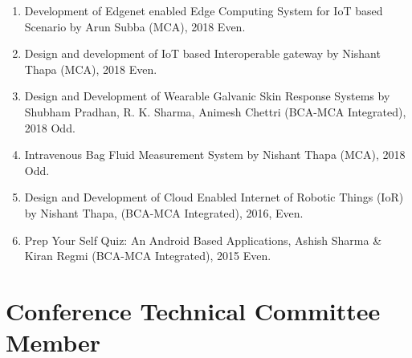 \documentclass[11pt,a4paper]{moderncv}
\begin{document}
\begin{adjustwidth}{6em}{0pt}
\begin{enumerate}
		\item Development of Edgenet enabled Edge Computing System for IoT based Scenario by Arun Subba (MCA), 2018 Even.
		
		\item Design and development of IoT based Interoperable gateway by Nishant Thapa (MCA), 2018 Even.
		
		\item Design and Development of Wearable Galvanic Skin Response Systems by Shubham Pradhan, R. K. Sharma, Animesh Chettri (BCA-MCA Integrated), 2018 Odd.
		
		\item Intravenous Bag Fluid Measurement System by Nishant Thapa (MCA), 2018 Odd.
		
		\item Design and Development of Cloud Enabled Internet of Robotic Things (IoR) by Nishant Thapa, (BCA-MCA Integrated), 2016, Even.
		
		\item Prep Your Self Quiz: An Android Based Applications, Ashish Sharma \& Kiran Regmi (BCA-MCA Integrated), 2015 Even.
		
		
	\end{enumerate}
\end{adjustwidth}




\section{\textbf{Conference Technical Committee Member}}
\end{document}
